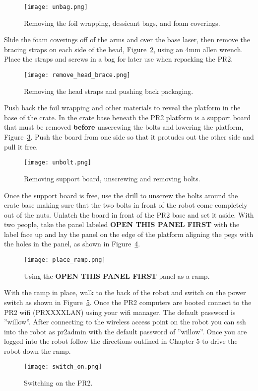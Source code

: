 \begin{figure}[h]
\centering
\texttt{[image: unbag.png]}
\caption{Removing the foil wrapping, dessicant bags, and foam coverings.}
\label{fig:unbagPR2}
\end{figure}

Slide the foam coverings off of the arms and over the base laser, then remove
the bracing straps on each side of the head, Figure~\ref{fig:head_straps}, using
an 4mm allen wrench. Place the straps and screws in a bag for later use when
repacking the PR2.

\begin{figure}[h]
\centering
\texttt{[image: remove\_head\_brace.png]}
\caption{Removing the head straps and pushing back packaging.}
\label{fig:head_straps}
\end{figure}

Push back the foil wrapping and other materials to reveal the platform in the
base of the crate. In the crate base beneath the PR2 platform is a support board
that must be removed {\bf before} unscrewing the bolts and lowering the platform, 
Figure~\ref{fig:unbolt}. Push the board from one side so that it protudes out the 
other side and pull it free. 

\begin{figure}[h]
\centering
\texttt{[image: unbolt.png]}
\caption{Removing support board, unscrewing and removing bolts.}
\label{fig:unbolt}
\end{figure}

Once the support board is free, use the drill to unscrew the bolts around
the crate base making sure that the two bolts in front of the robot come
completely out of the nuts. Unlatch the board in front of the PR2 base and set
it aside. With two people, take the panel labeled {\bf OPEN THIS PANEL FIRST} with
the label face up and lay the panel on the edge of the platform aligning the pegs
with the holes in the panel, as shown in Figure~\ref{fig:place_ramp}.

\begin{figure}[h]
\centering
\texttt{[image: place\_ramp.png]}
\caption{Using the {\bf OPEN THIS PANEL FIRST} panel as a ramp.}
\label{fig:place_ramp}
\end{figure}

With the ramp in place, walk to the back of the robot and switch on the power switch
as shown in Figure~\ref{fig:switch_on}. Once the PR2 computers are booted connect 
to the PR2 wifi (PRXXXXLAN) using your wifi manager. The default password is ''willow''. 
After connecting to the wireless access point on the robot you can ssh into the robot 
as pr2admin with the default password of ''willow''. Once you are logged into the robot 
follow the directions outlined in Chapter 5 to drive the robot down the ramp. 

\begin{figure}[h]
\centering
\texttt{[image: switch\_on.png]}
\caption{Switching on the PR2.}
\label{fig:switch_on}
\end{figure}

